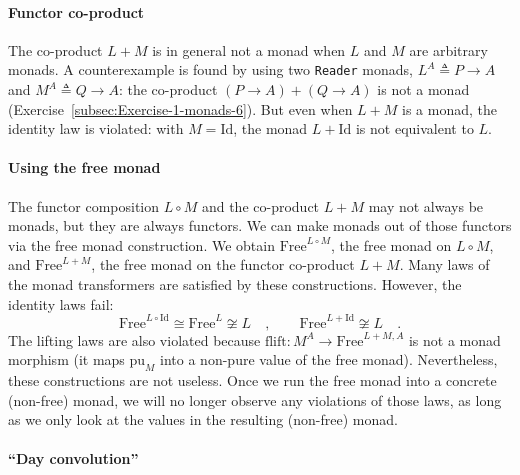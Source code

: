 \paragraph{Functor co-product}

The co-product $L+M$ is in general not a monad when $L$ and $M$
are arbitrary monads. A counterexample is found by using two \lstinline!Reader!
monads, $L^{A}\triangleq P\rightarrow A$ and $M^{A}\triangleq Q\rightarrow A$:
the co-product $\left(P\rightarrow A\right)+\left(Q\rightarrow A\right)$
is not a monad (Exercise~\ref{subsec:Exercise-1-monads-6}). But
even when $L+M$ is a monad, the identity law is violated: with $M=\text{Id}$,
the monad $L+\text{Id}$ is not equivalent to $L$.

\paragraph{Using the free monad}

The functor composition $L\circ M$ and the co-product $L+M$ may
not always be monads, but they are always functors. We can make monads
out of those functors via the free monad construction. We obtain $\text{Free}^{L\circ M}$,
the free monad on $L\circ M$, and $\text{Free}^{L+M}$, the free
monad on the functor co-product $L+M$. Many laws of the monad transformers
are satisfied by these constructions. However, the identity laws fail:
\[
\text{Free}^{L\circ\text{Id}}\cong\text{Free}^{L}\not\cong L\quad,\quad\quad\text{Free}^{L+\text{Id}}\not\cong L\quad.
\]
The lifting laws are also violated because $\text{flift}:M^{A}\rightarrow\text{Free}^{L+M,A}$
is not a monad morphism (it maps $\text{pu}_{M}$ into a non-pure
value of the free monad). Nevertheless, these constructions are not
useless. Once we run the free monad into a concrete (non-free) monad,
we will no longer observe any violations of those laws, as long as
we only look at the values in the resulting (non-free) monad.

\paragraph{\textquotedblleft Day convolution\textquotedblright}

